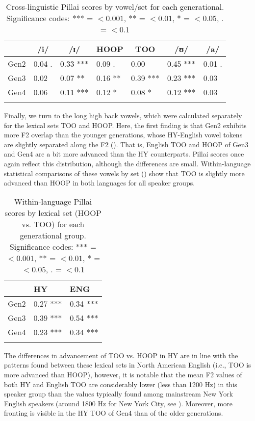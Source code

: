 \documentclass[output=paper]{langsci/langscibook}
\begin{document}
\begin{table}
\begin{tabular}{*{7}{l}} 
\lsptoprule
& \multicolumn{1}{c}{/i/} & \multicolumn{1}{c}{/ɪ/} &  \multicolumn{1}{c}{HOOP} &  \multicolumn{1}{c}{TOO} &  \multicolumn{1}{c}{/ʊ/} &  \multicolumn{1}{c}{/a/} \\
\midrule
Gen2 & 0.04 . & 0.33 *** & 0.09 . & 0.00  & 0.45 *** & 0.01 .\\
Gen3 & 0.02 & 0.07 ** & 0.16 ** & 0.39 *** & 0.23 *** & 0.03  \\
Gen4 & 0.06  & 0.11 *** & 0.12 * & 0.08 * & 0.12 *** & 0.03  \\
\lspbottomrule
\end{tabular}
\caption{Cross-linguistic Pillai scores by vowel/set for each generational. Significance codes: *** = $<0.001$, ** = $<0.01$, * = $<0.05$, . = $<0.1$}\label{tab:nove:4}
\end{table}

Finally, we turn to the long high back vowels, which were calculated separately for the lexical sets TOO and HOOP. Here, the first finding is that Gen2 exhibits more F2 overlap than the younger generations, whose HY-English vowel tokens are slightly separated along the F2 (). That is, English TOO and HOOP of Gen3 and Gen4 are a bit more advanced than the HY counterparts. Pillai scores once again reflect this distribution, although the differences are small. Within-language statistical comparisons of these vowels by set () show that TOO is slightly more advanced than HOOP in both languages for all speaker groups.

\begin{table}
\begin{tabular}{lll}
\lsptoprule 
 & {HY} & {ENG} \\
\midrule
Gen2 & 0.27 *** & 0.34 ***\\
Gen3 & 0.39 {***} & 0.54 {***}\\
Gen4 & 0.23 {***} & 0.34 {***}\\
\lspbottomrule
\end{tabular}
\caption{Within-language Pillai scores by lexical set (HOOP vs. TOO) for each generational group. Significance codes: *** = $<0.001$, ** = $<0.01$, * = $<0.05$, . = $<0.1$}
\label{tab:nove:5}
\end{table}

The differences in advancement of TOO vs. HOOP in HY are in line with the patterns found between these lexical sets in North American English (i.e., TOO is more advanced than HOOP), however, it is notable that the mean F2 values of both HY and English TOO are considerably lower (less than 1200 Hz) in this speaker group than the values typically found among mainstream New York English speakers (around 1800 Hz for New York City, see \citealt{HaddicanEtAl2019, Newman2014, Wong2014}). Moreover, more fronting is visible in the HY TOO of Gen4 than of the older generations.
\end{document}
